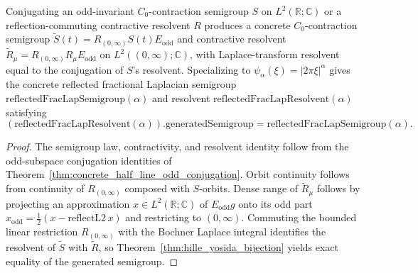 \begin{theorem}\label{thm:concrete_reflected_frac_lap_hy}
\leanok
Conjugating an odd-invariant $C_0$-contraction semigroup $S$ on $L^2(\mathbb{R}; \mathbb{C})$ or a reflection-commuting contractive resolvent $R$ produces a concrete $C_0$-contraction semigroup $\widetilde{S}(t) = R_{(0, \infty)} S(t) E_{\mathrm{odd}}$ and contractive resolvent $\widetilde{R}_\mu = R_{(0, \infty)} R_\mu E_{\mathrm{odd}}$ on $L^2((0, \infty); \mathbb{C})$, with Laplace-transform resolvent equal to the conjugation of $S$'s resolvent. Specializing to $\psi_\alpha(\xi) = \lvert 2\pi\xi \rvert^\alpha$ gives the concrete reflected fractional Laplacian semigroup $\mathrm{reflectedFracLapSemigroup}(\alpha)$ and resolvent $\mathrm{reflectedFracLapResolvent}(\alpha)$ satisfying
\[
  (\mathrm{reflectedFracLapResolvent}(\alpha)).\mathrm{generatedSemigroup} = \mathrm{reflectedFracLapSemigroup}(\alpha).
\]
\end{theorem}

\begin{proof}
\leanok
The semigroup law, contractivity, and resolvent identity follow from the odd-subspace conjugation identities of Theorem~\ref{thm:concrete_half_line_odd_conjugation}. Orbit continuity follows from continuity of $R_{(0, \infty)}$ composed with $S$-orbits. Dense range of $\widetilde{R}_\mu$ follows by projecting an approximation $x \in L^2(\mathbb{R}; \mathbb{C})$ of $E_{\mathrm{odd}} g$ onto its odd part $x_{\mathrm{odd}} = \frac{1}{2}(x - \mathrm{reflectL2}\,x)$ and restricting to $(0, \infty)$. Commuting the bounded linear restriction $R_{(0, \infty)}$ with the Bochner Laplace integral identifies the resolvent of $\widetilde{S}$ with $\widetilde{R}$, so Theorem~\ref{thm:hille_yosida_bijection} yields exact equality of the generated semigroup.
\end{proof}


